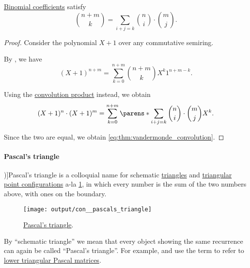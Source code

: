 \begin{theorem}\label{thm:vandermonde_convolution}
  \hyperref[def:binomial_coefficient]{Binomial coefficients} satisfy
  \begin{equation}\label{eq:thm:vandermonde_convolution}
    \binom {n + m} k = \sum_{i+j=k} \binom n i \cdot \binom m j.
  \end{equation}
\end{theorem}
\begin{proof}
  Consider the polynomial \( X + 1 \) over any commutative semiring.

  By , we have
  \begin{equation*}
    (X + 1)^{n+m} = \sum_{k=0}^{n+m} \binom {n+m} k X^k 1^{n+m-k}.
  \end{equation*}

  Using the \hyperref[def:semigroup_algebra]{convolution product} instead, we obtain
  \begin{equation*}
    (X + 1)^n \cdot (X + 1)^m = \sum_{k=0}^{n+m} \parens*{ \sum_{i+j=k} \binom n i \cdot \binom m j } X^k.
  \end{equation*}

  Since the two are equal, we obtain \eqref{eq:thm:vandermonde_convolution}.
\end{proof}

\paragraph{Pascal's triangle}

\begin{concept}\label{con:pascals_triangle}
  \term[ru=треугольник Паскаля (\cite[\S 5.3.4]{Новиков2013ДискретнаяМатематика})]{Pascal's triangle} is a colloquial name for schematic \hyperref[def:triangle]{triangles} and \hyperref[def:triangular_point_configuration]{triangular point configurations} a-la \cref{fig:con:pascals_triangle}, in which every number is the sum of the two numbers above, with ones on the boundary.

  \begin{figure}[!ht]
    \centering
    \texttt{[image: output/con\_\_pascals\_triangle]}
    \caption{\hyperref[con:pascals_triangle]{Pascal's triangle}.}\label{fig:con:pascals_triangle}
  \end{figure}

  By \enquote{schematic triangle} we mean that every object showing the same recurrence can again be called \enquote{Pascal's triangle}. For example,  and  use the term to refer to \hyperref[def:pascal_matrix/lower]{lower triangular Pascal matrices}.
\end{concept}

